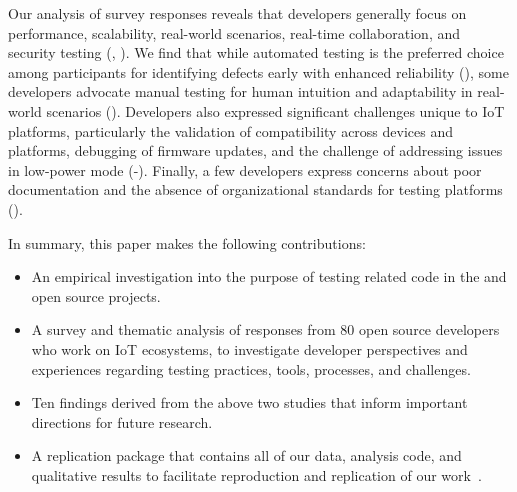 Our analysis of survey responses reveals that developers generally focus on performance, scalability, real-world scenarios, real-time collaboration, and security testing (, ). 
We find that while automated testing is the preferred choice among participants for identifying defects early with enhanced reliability (), some developers advocate manual testing for human intuition and adaptability in real-world scenarios (). Developers also expressed significant challenges unique to IoT platforms, particularly the validation of compatibility across devices and platforms, debugging of firmware updates, and the challenge of addressing issues in low-power mode (-). Finally, a few developers express concerns about poor documentation and the absence of organizational standards for testing \iot platforms ().

In summary, this paper makes the following contributions:

\begin{itemize}
    \item{An empirical investigation into the purpose of testing related code in the \openhab and \homeassistant open source projects.}
    \item{A survey and thematic analysis of responses from 80 open source developers who work on IoT ecosystems, to investigate developer perspectives and experiences regarding testing practices, tools, processes, and challenges.}
    \item{Ten findings derived from the above two studies that inform important directions for future research.}
    \item{A replication package that contains all of our data, analysis code, and qualitative results to facilitate reproduction and replication of our work~\cite{appendix}.}
\end{itemize}
